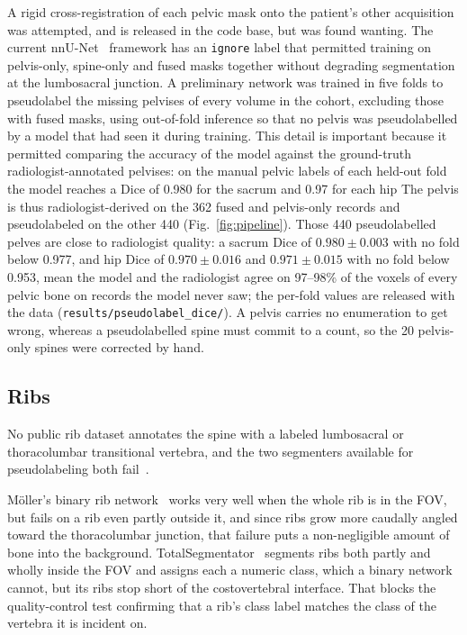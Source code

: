 \documentclass[aapm,mph,amsmath,amssymb,preprint,linenumbers]{revtex4-2}
\begin{document}
A rigid cross-registration of each pelvic mask onto the patient's other acquisition was
attempted, and is released in the code base, but was found wanting. The current
nnU-Net~\cite{nnunet} framework has an \texttt{ignore} label that permitted training on
pelvis-only, spine-only and fused masks together without degrading segmentation at the
lumbosacral junction. A preliminary network was trained in five folds to pseudolabel the
missing pelvises of every volume in the cohort, excluding those with fused masks, using
out-of-fold inference so that no pelvis was pseudolabelled by a model that had seen it during
training. This detail is important because it permitted comparing the accuracy of the model
against the ground-truth radiologist-annotated pelvises: on the manual pelvic labels of each
held-out fold the model reaches a Dice of 0.980 for the sacrum and 0.97 for each hip
The pelvis is thus radiologist-derived on the 362 fused and
pelvis-only records and pseudolabeled on the other 440 (Fig.~\ref{fig:pipeline}). Those 440 pseudolabelled pelves are close to radiologist quality: a sacrum Dice of $0.980 \pm 0.003$ with no fold below 0.977, and hip Dice of $0.970 \pm 0.016$ and $0.971 \pm 0.015$ with no fold below 0.953, mean the model and the radiologist agree on 97--98\% of the voxels of every pelvic bone on records the model never saw; the per-fold values are released with the data (\texttt{results/pseudolabel\_dice/}). A pelvis carries no enumeration to get wrong,
whereas a pseudolabelled spine must commit to a count, so the 20 pelvis-only spines were
corrected by hand.

\subsection{Ribs}

No public rib dataset annotates the spine with a labeled lumbosacral or thoracolumbar
transitional vertebra, and the two segmenters available for pseudolabeling both
fail~\cite{moller2026,totalsegmentator}.

Möller's binary rib network~\cite{moller2026} works very well when the whole rib is in the FOV,
but fails on a rib even partly outside it, and since ribs grow more caudally angled toward the
thoracolumbar junction, that failure puts a non-negligible amount of bone into the background.
TotalSegmentator~\cite{totalsegmentator} segments ribs both partly and wholly inside the FOV
and assigns each a numeric class, which a binary network cannot, but its ribs stop short of the
costovertebral interface. That blocks the quality-control test confirming that a rib's class
label matches the class of the vertebra it is incident on.
\end{document}
